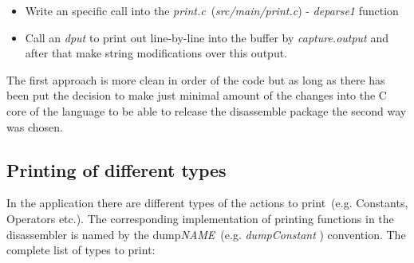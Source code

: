 \documentclass[thesis=M,english]{FITthesis}[2018/10/20]
\begin{document}
\begin{itemize}
	\item Write an specific call into the \textit{print.c}~(\textit{src/main/print.c}) - \textit{deparse1} function
	\item Call an \textit{dput} to print out line-by-line into the buffer by \textit{capture.output} and after that make string modifications over this output.
\end{itemize}

The first approach is more clean in order of the code but as long as there has been put the decision to make just minimal amount of the changes into the C core of the language to be able to release the disassemble package the second way was chosen.


\subsection{Printing of different types}

In the application there are different types of the actions to print~(e.g. Constants, Operators etc.). The corresponding implementation of printing functions in the disassembler is named by the dump\textit{NAME}~(e.g. \textit{dumpConstant} ) convention. The complete list of types to print:
\end{document}

